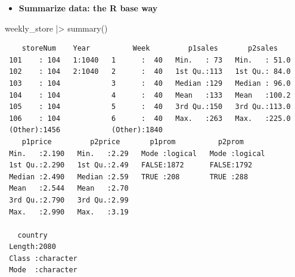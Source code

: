 \documentclass[
  ignorenonframetext,
]{beamer}
\newenvironment{Shaded}{\begin{snugshade}}{\end{snugshade}}
\newcommand{\FunctionTok}[1]{\textcolor[rgb]{0.28,0.35,0.67}{#1}}
\newcommand{\NormalTok}[1]{\textcolor[rgb]{0.00,0.23,0.31}{#1}}
\newcommand{\SpecialCharTok}[1]{\textcolor[rgb]{0.37,0.37,0.37}{#1}}
\providecommand{\tightlist}{%
  \setlength{\itemsep}{0pt}\setlength{\parskip}{0pt}}\usepackage{longtable,booktabs,array}
\begin{document}
\begin{frame}[fragile]{}
\label{section-7}
\begin{itemize}
\tightlist
\item
  \textbf{Summarize data: the R base way}
\end{itemize}

\tiny

\begin{Shaded}
\begin{Highlighting}[]
\NormalTok{weekly\_store }\SpecialCharTok{|\textgreater{}} \FunctionTok{summary}\NormalTok{()}
\end{Highlighting}
\end{Shaded}

\begin{verbatim}
    storeNum    Year          Week         p1sales       p2sales     
 101    : 104   1:1040   1      :  40   Min.   : 73   Min.   : 51.0  
 102    : 104   2:1040   2      :  40   1st Qu.:113   1st Qu.: 84.0  
 103    : 104            3      :  40   Median :129   Median : 96.0  
 104    : 104            4      :  40   Mean   :133   Mean   :100.2  
 105    : 104            5      :  40   3rd Qu.:150   3rd Qu.:113.0  
 106    : 104            6      :  40   Max.   :263   Max.   :225.0  
 (Other):1456            (Other):1840                                
    p1price         p2price       p1prom          p2prom       
 Min.   :2.190   Min.   :2.29   Mode :logical   Mode :logical  
 1st Qu.:2.290   1st Qu.:2.49   FALSE:1872      FALSE:1792     
 Median :2.490   Median :2.59   TRUE :208       TRUE :288      
 Mean   :2.544   Mean   :2.70                                  
 3rd Qu.:2.790   3rd Qu.:2.99                                  
 Max.   :2.990   Max.   :3.19                                  
                                                               
   country         
 Length:2080       
 Class :character  
 Mode  :character  
                   
                   
                   
                   
\end{verbatim}
\end{frame}
\end{document}
